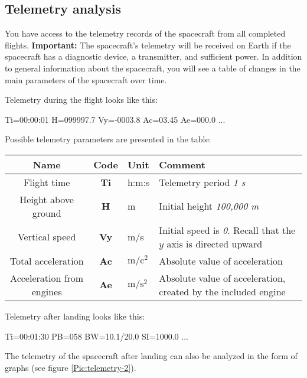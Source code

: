 \documentclass[12pt,a4paper]{article}
\begin{document}
\subsection{Telemetry analysis}

You have access to the telemetry records of the spacecraft from all completed flights. \textbf{Important:} The spacecraft's telemetry will be received on Earth if the spacecraft has a diagnostic device, a transmitter, and sufficient power. In addition to general information about the spacecraft, you will see a table of changes in the main parameters of the spacecraft over time.

Telemetry during the flight looks like this:

\begin{verbatim*}
Ti=00:00:01 H=099997.7 Vy=-0003.8 Ac=03.45 Ae=000.0
...
\end{verbatim*}

Possible telemetry parameters are presented in the table:

\begin{center}
\begin{tabular}{ |c|c|p{2.5cm}|p{6cm}| }
  \hline
  \textbf{Name} & \textbf{Code} & \textbf{Unit} & \textbf{Comment} \\
   \hline
   Flight time & \textbf{Ti} & h:m:s & Telemetry period \emph{1 s}\\
   \hline
   Height above ground & \textbf{H} & m & Initial height \emph{100,000 m}\\
   \hline
   Vertical speed & \textbf{Vy} & m/s & Initial speed is
   \emph{0}. Recall that the $y$ axis is directed upward\\
   \hline
   Total acceleration & \textbf{Ac} & $\text{m}/\text{c}^{2}$ & Absolute value of acceleration\\
   \hline
   Acceleration from engines & \textbf{Ae} & $\text{m}/\text{s}^{2}$ & Absolute value of acceleration,
   created by the included engine\\
   \hline
\end{tabular}
\end{center}

Telemetry after landing looks like this:

\begin{verbatim*}
Ti=00:01:30 PB=058 BW=10.1/20.0 SI=1000.0
...
\end{verbatim*}

The telemetry of the spacecraft after landing can also be analyzed in the form of graphs (see figure
\ref{Pic:telemetry-2}).
\end{document}
